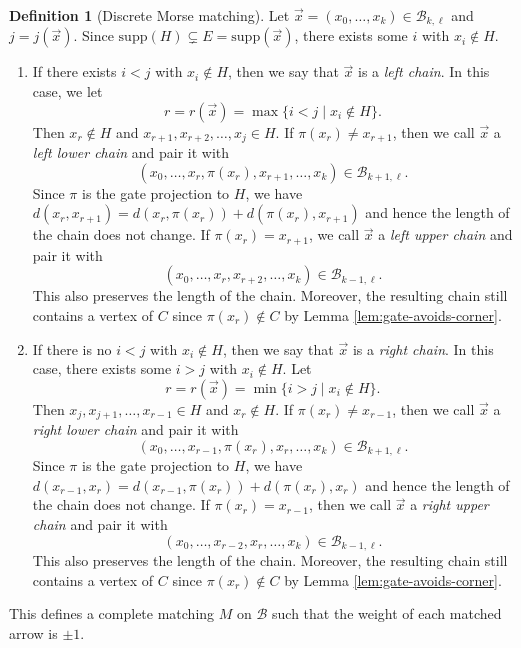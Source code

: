 \documentclass{amsart}
\numberwithin{equation}{section}
\theoremstyle{plain}
\theoremstyle{remark}
\theoremstyle{definition}
\newtheorem{defn}[thm]{Definition}
\numberwithin{equation}{section}
\newcommand{\B}{\mathcal{B}}
\newcommand{\supp}{\mathrm{supp}}
\begin{document}
\begin{defn}[Discrete Morse matching]
    Let $\vec{x}=(x_0,\ldots,x_k)\in\B_{k,\ell}$ and $j=j(\vec{x})$.
    Since $\supp(H)\subsetneq E=\supp(\vec{x})$, there exists some $i$ with $x_i\notin H$.
    \begin{enumerate}
        \item If there exists $i<j$ with $x_i\not\in H$, then we say that $\vec{x}$ is a \emph{left chain}.
        In this case, we let
        \[
        r=r(\vec{x})=\max\{i<j\mid x_i\notin H\}.
        \]
        Then $x_r\notin H$ and $x_{r+1},x_{r+2},\ldots,x_j\in H$.
        If $\pi(x_r)\neq x_{r+1}$, then we call $\vec{x}$ a \emph{left lower chain} and pair it with
        \[
        (x_0,\dots,x_r,\pi(x_r),x_{r+1},\dots,x_k) \in \B_{k+1,\ell}.
        \]
        Since $\pi$ is the gate projection to $H$, we have $d(x_r,x_{r+1})=d(x_r,\pi(x_r))+d(\pi(x_r),x_{r+1})$ and hence the length of the chain does not change.
        If $\pi(x_r)=x_{r+1}$, we call $\vec{x}$ a \emph{left upper chain} and pair it with
        \[
        (x_0,\dots,x_r,x_{r+2},\dots,x_k)\in \B_{k-1,\ell}.
        \]
        This also preserves the length of the chain.
        Moreover, the resulting chain still contains a vertex of $C$ since $\pi(x_r)\notin C$ by Lemma \ref{lem:gate-avoids-corner}.
        \item If there is no $i<j$ with $x_i\not\in H$, then we say that $\vec{x}$ is a \emph{right chain}.
        In this case, there exists some $i>j$ with $x_i\notin H$.
        Let
        \[
        r=r(\vec{x})=\min\{i>j\mid x_i\notin H\}.
        \]
        Then $x_j,x_{j+1},\ldots,x_{r-1}\in H$ and $x_r\notin H$.
        If $\pi(x_r)\neq x_{r-1}$, then we call $\vec{x}$ a \emph{right lower chain} and pair it with
        \[
        (x_0,\ldots,x_{r-1},\pi(x_r),x_r,\ldots,x_k) \in \B_{k+1,\ell}.
        \]
        Since $\pi$ is the gate projection to $H$, we have $d(x_{r-1},x_r)=d(x_{r-1},\pi(x_r))+d(\pi(x_r),x_r)$ and hence the length of the chain does not change.
        If $\pi(x_r)=x_{r-1}$, then we call $\vec{x}$ a \emph{right upper chain} and pair it with
        \[
        (x_0,\ldots,x_{r-2},x_r,\ldots,x_k)\in \B_{k-1,\ell}.
        \]
        This also preserves the length of the chain.
        Moreover, the resulting chain still contains a vertex of $C$ since $\pi(x_r)\notin C$ by Lemma \ref{lem:gate-avoids-corner}.
    \end{enumerate}
    This defines a complete matching $M$ on $\B$ such that the weight of each matched arrow is $\pm 1$.
\end{defn}
\end{document}

